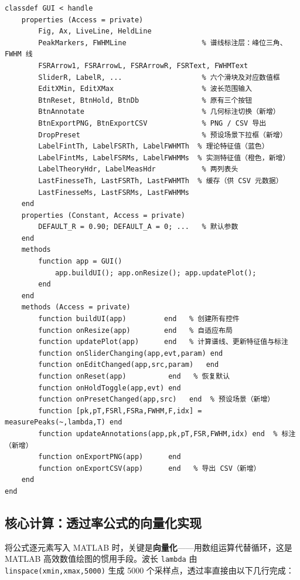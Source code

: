 \documentclass[10.5pt]{config}
\begin{document}
\begin{listing}[H]
\begin{verbatim}
classdef GUI < handle
    properties (Access = private)
        Fig, Ax, LiveLine, HeldLine
        PeakMarkers, FWHMLine                  % 谱线标注层：峰位三角、FWHM 线
        FSRArrow1, FSRArrowL, FSRArrowR, FSRText, FWHMText
        SliderR, LabelR, ...                   % 六个滑块及对应数值框
        EditXMin, EditXMax                     % 波长范围输入
        BtnReset, BtnHold, BtnDb               % 原有三个按钮
        BtnAnnotate                            % 几何标注切换（新增）
        BtnExportPNG, BtnExportCSV             % PNG / CSV 导出
        DropPreset                             % 预设场景下拉框（新增）
        LabelFintTh, LabelFSRTh, LabelFWHMTh  % 理论特征值（蓝色）
        LabelFintMs, LabelFSRMs, LabelFWHMMs  % 实测特征值（橙色，新增）
        LabelTheoryHdr, LabelMeasHdr           % 两列表头
        LastFinesseTh, LastFSRTh, LastFWHMTh  % 缓存（供 CSV 元数据）
        LastFinesseMs, LastFSRMs, LastFWHMMs
    end
    properties (Constant, Access = private)
        DEFAULT_R = 0.90; DEFAULT_A = 0; ...   % 默认参数
    end
    methods
        function app = GUI()
            app.buildUI(); app.onResize(); app.updatePlot();
        end
    end
    methods (Access = private)
        function buildUI(app)         end   % 创建所有控件
        function onResize(app)        end   % 自适应布局
        function updatePlot(app)      end   % 计算谱线、更新特征值与标注
        function onSliderChanging(app,evt,param) end
        function onEditChanged(app,src,param)   end
        function onReset(app)          end   % 恢复默认
        function onHoldToggle(app,evt) end
        function onPresetChanged(app,src)   end  % 预设场景（新增）
        function [pk,pT,FSRl,FSRa,FWHM,F,idx] = measurePeaks(~,lambda,T) end
        function updateAnnotations(app,pk,pT,FSR,FWHM,idx) end  % 标注（新增）
        function onExportPNG(app)      end
        function onExportCSV(app)      end   % 导出 CSV（新增）
    end
end
\end{verbatim}
\caption{\texttt{GUI} 类的整体骨架}
\end{listing}

\subsection{核心计算：透过率公式的向量化实现}

将公式逐元素写入 MATLAB 时，关键是\textbf{向量化}——用数组运算代替循环，这是 MATLAB 高效数值绘图的惯用手段。波长 \texttt{lambda} 由 \texttt{linspace(xmin,xmax,5000)} 生成 5000 个采样点，透过率直接由以下几行完成：
\end{document}
